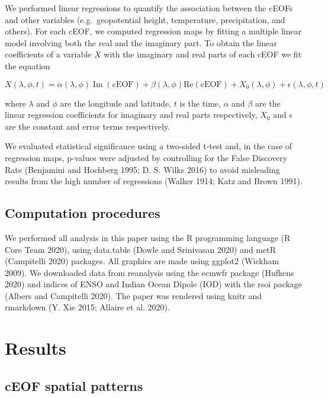 \documentclass[smallextended]{svjour3}       %
\begin{document}
We performed linear regressions to quantify the association between the cEOFs and other variables (e.g.~geopotential height, temperature, precipitation, and others).
For each cEOF, we computed regression maps by fitting a multiple linear model involving both the real and the imaginary part.
To obtain the linear coefficients of a variable \(X\) with the imaginary and real parts of each cEOF we fit the equation

\[
X(\lambda, \phi, t) = \alpha(\lambda, \phi) \operatorname{Im}(\mathrm{cEOF}) + \beta(\lambda, \phi) \mathrm{Re}(\mathrm{cEOF}) + X_0(\lambda, \phi) + \epsilon(\lambda, \phi, t)
\]

where \(\lambda\) and \(\phi\) are the longitude and latitude, \(t\) is the time, \(\alpha\) and \(\beta\) are the linear regression coefficients for imaginary and real parts respectively, \(X_0\) and \(\epsilon\) are the constant and error terms respectively.

We evaluated statistical significance using a two-sided t-test and, in the case of regression maps, p-values were adjusted by controlling for the False Discovery Rate (Benjamini and Hochberg 1995; D. S. Wilks 2016) to avoid misleading results from the high number of regressions (Walker 1914; Katz and Brown 1991).

\hypertarget{computation-procedures}{%
\subsection{Computation procedures}\label{computation-procedures}}

We performed all analysis in this paper using the R programming language (R Core Team 2020), using data.table (Dowle and Srinivasan 2020) and metR (Campitelli 2020) packages.
All graphics are made using ggplot2 (Wickham 2009).
We downloaded data from reanalysis using the ecmwfr package (Hufkens 2020) and indices of ENSO and Indian Ocean Dipole (IOD) with the rsoi package (Albers and Campitelli 2020).
The paper was rendered using knitr and rmarkdown (Y. Xie 2015; Allaire et al. 2020).

\hypertarget{results}{%
\section{Results}\label{results}}

\hypertarget{spatial}{%
\subsection{cEOF spatial patterns}\label{spatial}}
\end{document}
